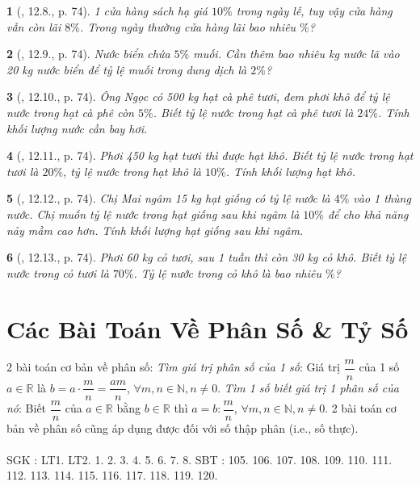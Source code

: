 \documentclass{article}
\newtheorem{baitoan}{}
\begin{document}
\begin{baitoan}[\cite{TLCT_THCS_Toan_6_so_hoc}, 12.8., p. 74]
	1 cửa hàng sách hạ giá $10\%$ trong ngày lễ, tuy vậy cửa hàng vẫn còn lãi $8\%$. Trong ngày thường cửa hàng lãi bao nhiêu $\%$?
\end{baitoan}

\begin{baitoan}[\cite{TLCT_THCS_Toan_6_so_hoc}, 12.9., p. 74]
	Nước biển chứa $5\%$ muối. Cần thêm bao nhiêu {\rm kg} nước lã vào {\rm20 kg} nước biển để tỷ lệ muối trong dung dịch là $2\%$?
\end{baitoan}

\begin{baitoan}[\cite{TLCT_THCS_Toan_6_so_hoc}, 12.10., p. 74]
	Ông Ngọc có {\rm500 kg} hạt cà phê tươi, đem phơi khô để tỷ lệ nước trong hạt cà phê còn $5\%$. Biết tỷ lệ nước trong hạt cà phê tươi là $24\%$. Tính khối lượng nước cần bay hơi.
\end{baitoan}

\begin{baitoan}[\cite{TLCT_THCS_Toan_6_so_hoc}, 12.11., p. 74]
	Phơi {\rm450 kg} hạt tươi thì được hạt khô. Biết tỷ lệ nước trong hạt tươi là $20\%$, tỷ lệ nước trong hạt khô là $10\%$. Tính khối lượng hạt khô.
\end{baitoan}

\begin{baitoan}[\cite{TLCT_THCS_Toan_6_so_hoc}, 12.12., p. 74]
	Chị Mai ngâm {\rm15 kg} hạt giống có tỷ lệ nước là $4\%$ vào 1 thùng nước. Chị muốn tỷ lệ nước trong hạt giống sau khi ngâm là $10\%$ để cho khả năng nảy mầm cao hơn. Tính khối lượng hạt giống sau khi ngâm.
\end{baitoan}

\begin{baitoan}[\cite{TLCT_THCS_Toan_6_so_hoc}, 12.13., p. 74]
	Phơi {\rm60 kg} cỏ tươi, sau 1 tuần thì còn {\rm30 kg} cỏ khô. Biết tỷ lệ nước trong cỏ tươi là $70\%$. Tỷ lệ nước trong cỏ khô là bao nhiêu $\%$?
\end{baitoan}


\section{Các Bài Toán Về Phân Số \& Tỷ Số}
2 bài toán cơ bản về phân số:  \textit{Tìm giá trị phân số của 1 số}: Giá trị $\dfrac{m}{n}$ của 1 số $a\in\mathbb{R}$ là $b = a\cdot\dfrac{m}{n} = \dfrac{am}{n}$, $\forall m,n\in\mathbb{N},n\ne0$.  \textit{Tìm 1 số biết giá trị 1 phân số của nó}: Biết $\dfrac{m}{n}$ của $a\in\mathbb{R}$ bằng $b\in\mathbb{R}$ thì $a = b:\dfrac{m}{n}$, $\forall m,n\in\mathbb{N},n\ne0$.  2 bài toán cơ bản về phân số cũng áp dụng được đối với số thập phân (i.e., số thực).\\
\\
\noindent SGK \cite[Chap. V, \S10, pp. 67--70]{SGK_Toan_6_Canh_Dieu_tap_2}: LT1. LT2. 1. 2. 3. 4. 5. 6. 7. 8. SBT \cite[Chap. V, \S10, pp. 57--59]{SBT_Toan_6_Canh_Dieu_tap_2}: 105. 106. 107. 108. 109. 110. 111. 112. 113. 114. 115. 116. 117. 118. 119. 120.
\end{document}
